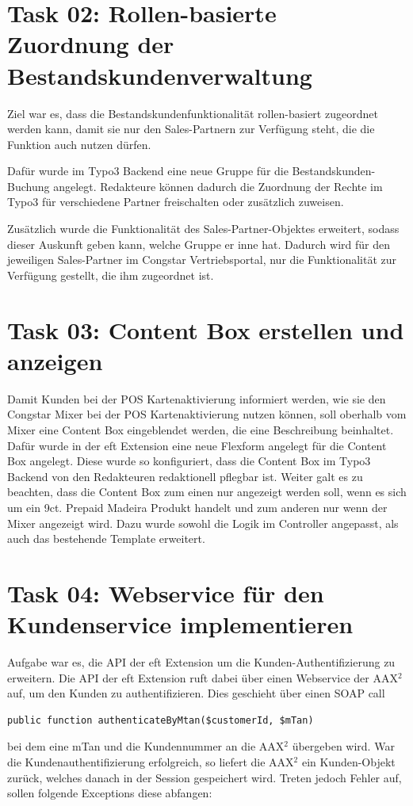 \documentclass[11pt,a4paper]{article} %
\begin{document}
\section{Task 02: Rollen-basierte Zuordnung der Bestandskundenverwaltung} \label{sec:t02}

Ziel war es, dass die Bestandskundenfunktionalität rollen-basiert zugeordnet werden kann, 
damit sie nur den Sales-Partnern zur Verfügung steht, die die Funktion auch nutzen dürfen.

Dafür wurde im Typo3 Backend eine neue Gruppe für die Bestandskunden-Buchung angelegt.
Redakteure können dadurch die Zuordnung der Rechte im Typo3 für verschiedene Partner freischalten
oder zusätzlich zuweisen.

Zusätzlich wurde die Funktionalität des Sales-Partner-Objektes erweitert, sodass dieser Auskunft geben kann, 
welche Gruppe er inne hat. Dadurch wird für den jeweiligen Sales-Partner im Congstar Vertriebsportal,
nur die Funktionalität zur Verfügung gestellt, die ihm zugeordnet ist.




\section{Task 03: Content Box erstellen und anzeigen}

Damit Kunden bei der POS Kartenaktivierung informiert werden, wie sie den Congstar Mixer bei der POS Kartenaktivierung
nutzen können, soll oberhalb vom Mixer eine Content Box eingeblendet werden, die eine Beschreibung beinhaltet.
Dafür wurde in der eft Extension eine neue Flexform angelegt für die Content Box angelegt.
Diese wurde so konfiguriert, dass die Content Box im Typo3 Backend von den Redakteuren redaktionell pflegbar ist.
Weiter galt es zu beachten, dass die Content Box zum einen nur angezeigt werden soll,
wenn es sich um ein 9ct. Prepaid Madeira Produkt handelt und zum anderen nur wenn der Mixer angezeigt wird.
Dazu wurde sowohl die Logik im Controller angepasst, als auch das bestehende Template erweitert.




\section{Task 04: Webservice für den Kundenservice implementieren}

Aufgabe war es, die API der eft Extension um die Kunden-Authentifizierung zu erweitern.
Die API der eft Extension ruft dabei über einen Webservice der AAX$^2$ auf, um den Kunden zu authentifizieren.
Dies geschieht über einen SOAP call 
\begin{lstlisting}
public function authenticateByMtan($customerId, $mTan)
\end{lstlisting}
bei dem eine mTan und die Kundennummer an die AAX$^2$ übergeben wird.
War die Kundenauthentifizierung erfolgreich, so liefert die AAX$^2$ ein Kunden-Objekt zurück, welches
danach in der Session gespeichert wird.
Treten jedoch Fehler auf, sollen folgende Exceptions diese abfangen:
\end{document}
